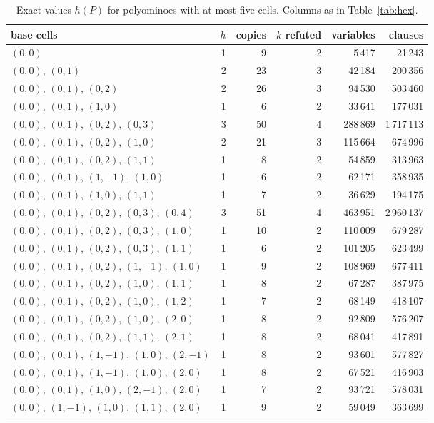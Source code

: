 \begin{table}[ht]
\centering\small
\caption{Exact values $h(P)$ for polyominoes with at most five cells. Columns as in Table~\ref{tab:hex}.}\label{tab:sq}
\begin{tabular}{lrrrrr}\toprule
base cells & $h$ & copies & $k$ refuted & variables & clauses\\\midrule
$(0,0)$ & 1 & 9 & 2 & 5\,417 & 21\,243 \\
$(0,0),\,(0,1)$ & 2 & 23 & 3 & 42\,184 & 200\,356 \\
$(0,0),\,(0,1),\,(0,2)$ & 2 & 26 & 3 & 94\,530 & 503\,460 \\
$(0,0),\,(0,1),\,(1,0)$ & 1 & 6 & 2 & 33\,641 & 177\,031 \\
$(0,0),\,(0,1),\,(0,2),\,(0,3)$ & 3 & 50 & 4 & 288\,869 & 1\,717\,113 \\
$(0,0),\,(0,1),\,(0,2),\,(1,0)$ & 2 & 21 & 3 & 115\,664 & 674\,996 \\
$(0,0),\,(0,1),\,(0,2),\,(1,1)$ & 1 & 8 & 2 & 54\,859 & 313\,963 \\
$(0,0),\,(0,1),\,(1,-1),\,(1,0)$ & 1 & 6 & 2 & 62\,171 & 358\,935 \\
$(0,0),\,(0,1),\,(1,0),\,(1,1)$ & 1 & 7 & 2 & 36\,629 & 194\,175 \\
$(0,0),\,(0,1),\,(0,2),\,(0,3),\,(0,4)$ & 3 & 51 & 4 & 463\,951 & 2\,960\,137 \\
$(0,0),\,(0,1),\,(0,2),\,(0,3),\,(1,0)$ & 1 & 10 & 2 & 110\,009 & 679\,287 \\
$(0,0),\,(0,1),\,(0,2),\,(0,3),\,(1,1)$ & 1 & 6 & 2 & 101\,205 & 623\,499 \\
$(0,0),\,(0,1),\,(0,2),\,(1,-1),\,(1,0)$ & 1 & 9 & 2 & 108\,969 & 677\,411 \\
$(0,0),\,(0,1),\,(0,2),\,(1,0),\,(1,1)$ & 1 & 8 & 2 & 67\,287 & 387\,975 \\
$(0,0),\,(0,1),\,(0,2),\,(1,0),\,(1,2)$ & 1 & 7 & 2 & 68\,149 & 418\,107 \\
$(0,0),\,(0,1),\,(0,2),\,(1,0),\,(2,0)$ & 1 & 8 & 2 & 92\,809 & 576\,207 \\
$(0,0),\,(0,1),\,(0,2),\,(1,1),\,(2,1)$ & 1 & 8 & 2 & 68\,041 & 417\,891 \\
$(0,0),\,(0,1),\,(1,-1),\,(1,0),\,(2,-1)$ & 1 & 8 & 2 & 93\,601 & 577\,827 \\
$(0,0),\,(0,1),\,(1,-1),\,(1,0),\,(2,0)$ & 1 & 8 & 2 & 67\,521 & 416\,903 \\
$(0,0),\,(0,1),\,(1,0),\,(2,-1),\,(2,0)$ & 1 & 7 & 2 & 93\,721 & 578\,031 \\
$(0,0),\,(1,-1),\,(1,0),\,(1,1),\,(2,0)$ & 1 & 9 & 2 & 59\,049 & 363\,699 \\
\bottomrule\end{tabular}
\end{table}
